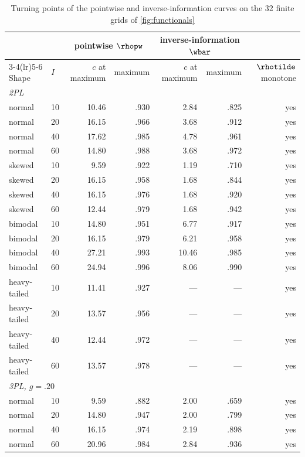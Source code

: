 \begin{table}[!htbp]
\centering
\caption{Turning points of the pointwise and inverse-information curves on the 32 finite grids of \cref{fig:functionals}}
\label{tab:turning}
\small
\setlength{\tabcolsep}{4pt}
\begin{tabular}{llrrrrr}
\toprule
 & & \multicolumn{2}{c}{pointwise $\rhopw$} & \multicolumn{2}{c}{inverse-information $\wbar$} & \\
\cmidrule(lr){3-4}\cmidrule(lr){5-6}
Shape & $I$ & $c$ at maximum & maximum & $c$ at maximum & maximum & $\rhotilde$ monotone \\
\midrule
\multicolumn{7}{l}{\emph{2PL}} \\
normal & 10 & 10.46 & .930 & 2.84 & .825 & yes \\
normal & 20 & 16.15 & .966 & 3.68 & .912 & yes \\
normal & 40 & 17.62 & .985 & 4.78 & .961 & yes \\
normal & 60 & 14.80 & .988 & 3.68 & .972 & yes \\
skewed & 10 & 9.59 & .922 & 1.19 & .710 & yes \\
skewed & 20 & 16.15 & .958 & 1.68 & .844 & yes \\
skewed & 40 & 16.15 & .976 & 1.68 & .920 & yes \\
skewed & 60 & 12.44 & .979 & 1.68 & .942 & yes \\
bimodal & 10 & 14.80 & .951 & 6.77 & .917 & yes \\
bimodal & 20 & 16.15 & .979 & 6.21 & .958 & yes \\
bimodal & 40 & 27.21 & .993 & 10.46 & .985 & yes \\
bimodal & 60 & 24.94 & .996 & 8.06 & .990 & yes \\
heavy-tailed & 10 & 11.41 & .927 & --- & --- & yes \\
heavy-tailed & 20 & 13.57 & .956 & --- & --- & yes \\
heavy-tailed & 40 & 12.44 & .972 & --- & --- & yes \\
heavy-tailed & 60 & 13.57 & .978 & --- & --- & yes \\
\multicolumn{7}{l}{\emph{3PL, $g=.20$}} \\
normal & 10 & 9.59 & .882 & 2.00 & .659 & yes \\
normal & 20 & 14.80 & .947 & 2.00 & .799 & yes \\
normal & 40 & 16.15 & .974 & 2.19 & .898 & yes \\
normal & 60 & 20.96 & .984 & 2.84 & .936 & yes \\

\end{tabular}
\end{table}
